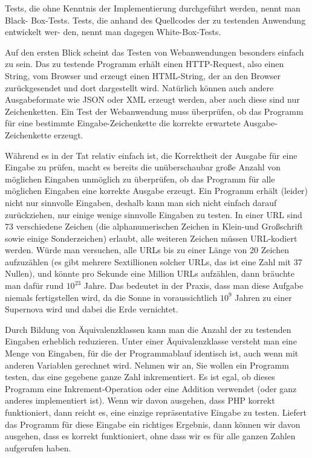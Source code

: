 Tests, die ohne Kenntnis der Implementierung durchgeführt werden, nennt man Black-
Box-Tests. Tests, die anhand des Quellcodes der zu testenden Anwendung entwickelt wer-
den, nennt man dagegen White-Box-Tests.

Auf den ersten Blick scheint das Testen von Webanwendungen besonders einfach zu sein.
Das zu testende Programm erhält einen HTTP-Request, also einen String, vom Browser
und erzeugt einen HTML-String, der an den Browser zurückgesendet und dort dargestellt
wird. Natürlich können auch andere Ausgabeformate wie JSON oder XML erzeugt werden,
aber auch diese sind nur Zeichenketten. Ein Test der Webanwendung muss überprüfen, ob
das Programm für eine bestimmte Eingabe-Zeichenkette die korrekte erwartete Ausgabe-
Zeichenkette erzeugt.

Während es in der Tat relativ einfach ist, die Korrektheit der Ausgabe für eine Eingabe zu
prüfen, macht es bereits die unüberschaubar große Anzahl von möglichen Eingaben unmöglich 
zu überprüfen, ob das Programm für alle möglichen Eingaben eine korrekte Ausgabe erzeugt. 
Ein Programm erhält (leider) nicht nur sinnvolle Eingaben, deshalb kann man sich nicht
einfach darauf zurückziehen, nur einige wenige sinnvolle Eingaben zu testen. In einer 
URL sind 73 verschiedene Zeichen (die alphanumerischen Zeichen in Klein-und Großschrift 
sowie einige Sonderzeichen) erlaubt, alle weiteren Zeichen müssen URL-kodiert werden. 
Würde man versuchen, alle URLs bis zu einer Länge von 20 Zeichen aufzuzählen 
(es gibt mehrere Sextillionen solcher URLs, das ist eine Zahl mit 37 Nullen), und könnte 
pro Sekunde eine Million URLs aufzählen, dann bräuchte man dafür rund $10^{23}$ Jahre. Das bedeutet 
in der Praxis, dass man diese Aufgabe niemals fertigstellen wird, da die Sonne in voraussichtlich $10^{9}$
Jahren zu einer Supernova wird und dabei die Erde vernichtet.

Durch Bildung von Äquivalenzklassen kann man die Anzahl der zu testenden Eingaben
erheblich reduzieren. Unter einer Äquivalenzklasse versteht man eine Menge von Eingaben,
für die der Programmablauf identisch ist, auch wenn mit anderen Variablen gerechnet wird. 
Nehmen wir an, Sie wollen ein Programm testen, das eine gegebene ganze Zahl inkrementiert. 
Es ist egal, ob dieses Programm eine Inkrement-Operation oder eine Addition verwendet 
(oder ganz anderes implementiert ist). Wenn wir davon ausgehen, dass PHP korrekt funktioniert, 
dann reicht es, eine einzige repräsentative Eingabe zu testen. Liefert das Programm für 
diese Eingabe ein richtiges Ergebnis, dann können wir davon ausgehen, dass es korrekt funktioniert, 
ohne dass wir es für alle ganzen Zahlen aufgerufen haben.

